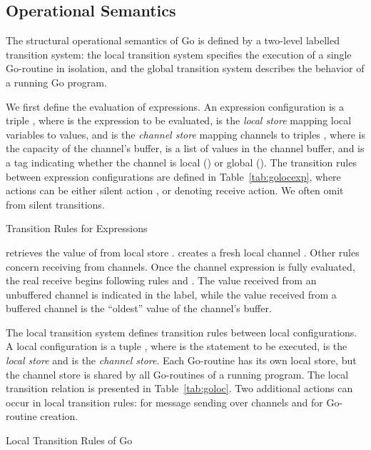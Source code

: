 \documentclass[runningheads, envcountsame, a4paper]{llncs}
\begin{document}
\subsection{Operational Semantics}
The structural operational semantics of Go is defined by a two-level labelled transition system:
the local transition system specifies the execution of a single Go-routine in isolation,
and the global transition system describes the behavior of a running Go program.

We first define the evaluation of expressions.
An expression configuration is a triple ,
where  is the expression to be evaluated,
 is the {\em local store} mapping local variables to values,
and  is the {\em channel store} mapping channels to triples ,
where  is the capacity of the channel's buffer,  is a list of values in the channel buffer,
and  is a tag indicating whether the channel is local () or global ().
The transition rules between expression configurations  are defined in Table~\ref{tab:golocexp},
where actions can be either silent action , or  denoting receive action.
We often omit  from silent transitions.

\begin{table}

\caption{Transition Rules for Expressions}
\label{tab:golocexp}
\end{table}

 retrieves the value of  from local store .
 creates a fresh local channel .
Other rules concern receiving from channels.
Once the channel expression is fully evaluated, the real receive begins following rules  and .
The value received from an unbuffered channel is indicated in the label, while the value received
from a buffered channel is the ``oldest'' value of the channel's buffer.

The local transition system defines transition rules between local configurations.
A local configuration is a tuple , where  is the statement to be executed,
 is the {\em local store} and  is the {\em channel store}.
Each Go-routine has its own local store, but the channel store is shared by all Go-routines of a running program.
The local transition relation  is presented in Table~\ref{tab:goloc}.
Two additional actions can occur in local transition rules:  for message sending over channels
and  for Go-routine creation.

\begin{table}

\caption{Local Transition Rules of Go}
\label{tab:goloc}
\end{table}
\end{document}
